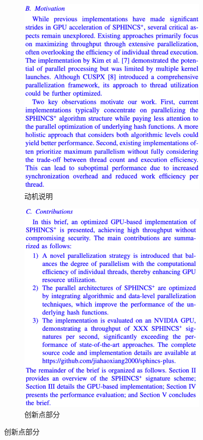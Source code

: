 \documentclass[slide]{../../custom}
\begin{document}
\begin{frame}
\begin{figure}[ht]
\begin{subfigure}[b]{0.32\textwidth}
      \includegraphics[width=\textwidth]{./fig/motivation.png}
      \caption{动机说明}
      \label{fig:motivation}
    \end{subfigure} \hfill
    \begin{subfigure}[b]{0.32\textwidth}
      \centering
      \includegraphics[width=\textwidth]{./fig/contributions.png}
      \caption{创新点部分}
      \label{fig:contributions}
    \end{subfigure}


\end{figure}
\end{frame}
\end{document}
